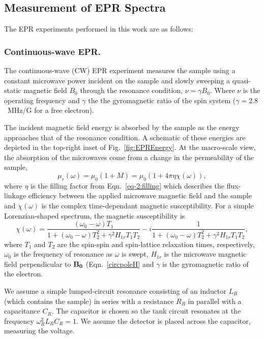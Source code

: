 \newpage
\subsection{Measurement of EPR Spectra}
The EPR experiments performed in this work are as follows:

\subsubsection*{Continuous-wave EPR.}
The continuous-wave (CW) EPR experiment measures the sample using a constant microwave power incident on the sample and slowly sweeping a quasi-static magnetic field $B_0$ through the resonance condition, $\nu =\gamma B_0$. Where $\nu$ is the operating frequency and $\gamma$ the the gyromagnetic ratio of the spin system ($\gamma = 2.8$~MHz/G for a free electron).  

The incident magnetic field energy is absorbed by the sample as the energy approaches that of the resonance condition. A schematic of these energies are depicted in the top-right inset of Fig.~\ref{fig:EPREnergy}. At the macro-scale view, the absorption of the microwaves come from a change in the permeability of the sample, 
\begin{equation}
    \mu_r(\omega) = \mu_0 (1+M) = \mu_0 (1+ 4 \pi \eta \chi(\omega)), \label{eq-2:permea}
\end{equation} 
where $\eta$ is the filling factor from Eqn.~\ref{eq-2:filling} which describes the flux-linkage efficiency between the applied microwave magnetic field and the sample and $\chi(\omega)$ is the complex time-dependant magnetic susceptibility. For a simple Lorenzian-shaped spectrum, the magnetic susceptibility is 
\begin{equation}
      \chi(\omega) = \frac{(\omega_0 - \omega) T_1 }{1+(\omega_0 - \omega)T_2^2+\gamma^2 H_{1r} T_1 T_2}- i \frac{1}{1+(\omega_0 - \omega)T_2^2+\gamma^2 H_{1r} T_1 T_2}, \label{eq-2:chi}
\end{equation}
where $T_1$ and $T_2$ are the spin-spin and spin-lattice relaxation times, respectively, $\omega_0$ is the frequency of resonance as $\omega$ is swept, $H_{1r}$ is the microwave magnetic field perpendicular to $\textbf{B}\boldsymbol{_{0}}$ (Eqn.~\ref{circpoleH} and $\gamma$ is the gyromagnetic ratio of the electron. \cite{abragam1961}

We assume a simple lumped-circuit resonance consisting of an inductor $L_R$ (which contains the sample) in series with a resistance $R_R$ in parallel with a capacitance $C_R$. The capacitor is chosen so the tank circuit resonates at the frequency $\omega_R^2 L_R C_R = 1$. We assume the detector is placed across the capacitor, measuring the voltage. 

